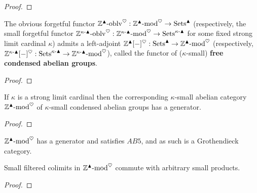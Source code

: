                 \begin{proof}
                    
                \end{proof}
            \begin{lemma} \label{lemma: free_condensed_abelian_groups}
                The obvious forgetful functor $\mathbb{Z}^{\blacktriangle}\text{-}\mathrm{oblv}^{\heartsuit}: \mathbb{Z}^{\blacktriangle}\text{-}\mathrm{mod}^{\heartsuit} \to \mathrm{Sets}^{\blacktriangle}$ (respectively, the small forgetful functor $\mathbb{Z}^{\kappa\text{-}\blacktriangle}\text{-}\mathrm{oblv}^{\heartsuit}: \mathbb{Z}^{\kappa\text{-}\blacktriangle}\text{-}\mathrm{mod}^{\heartsuit} \to \mathrm{Sets}^{\kappa\text{-}\blacktriangle}$ for some fixed strong limit cardinal $\kappa$) admits a left-adjoint $\mathbb{Z}^{\blacktriangle}[-]^{\heartsuit}: \mathrm{Sets}^{\blacktriangle} \to \mathbb{Z}^{\blacktriangle}\text{-}\mathrm{mod}^{\heartsuit}$ (respectively, $\mathbb{Z}^{\kappa\text{-}\blacktriangle}[-]^{\heartsuit}: \mathrm{Sets}^{\kappa\text{-}\blacktriangle} \to \mathbb{Z}^{\kappa\text{-}\blacktriangle}\text{-}\mathrm{mod}^{\heartsuit}$), called the functor of ($\kappa$-small) \textbf{free condensed abelian groups}. 
            \end{lemma}
                \begin{proof}
                    
                \end{proof}
            \begin{proposition} \label{prop: small_categories_of_condensed_abelian_groups_have_generators}
                If $\kappa$ is a strong limit cardinal then the corresponding $\kappa$-small abelian category $\mathbb{Z}^{\blacktriangle}\text{-}\mathrm{mod}^{\heartsuit}$ of $\kappa$-small condensed abelian groups has a generator.
            \end{proposition}
                \begin{proof}
                    
                \end{proof}
            \begin{corollary} \label{coro: small_categories_of_condensed_abelian_groups_are_grothendieck}
                $\mathbb{Z}^{\blacktriangle}\text{-}\mathrm{mod}^{\heartsuit}$ has a generator and satisfies $AB5$, and as such is a Grothendieck category.
            \end{corollary}
            \begin{proposition} \label{prop: the_category_of_condensed_abelian_groups_is_AB6}
                Small filtered colimits in $\mathbb{Z}^{\blacktriangle}\text{-}\mathrm{mod}^{\heartsuit}$ commute with arbitrary small products.
            \end{proposition}
                \begin{proof}
                    
                \end{proof}
                
